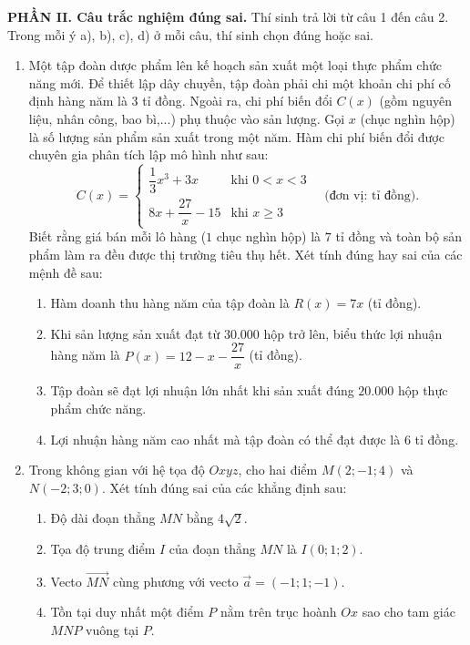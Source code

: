 \documentclass[12pt]{article}
\begin{document}
	\noindent\textbf{PHẦN II. Câu trắc nghiệm đúng sai.} Thí sinh trả lời từ câu 1 đến câu 2. Trong mỗi ý a), b), c), d) ở mỗi câu, thí sinh chọn đúng hoặc sai.
	\vspace{2mm}
	
	\begin{enumerate}[label=\textbf{Câu \arabic*.}, leftmargin=*]
		\item Một tập đoàn dược phẩm lên kế hoạch sản xuất một loại thực phẩm chức năng mới. Để thiết lập dây chuyền, tập đoàn phải chi một khoản chi phí cố định hàng năm là $3$ tỉ đồng. Ngoài ra, chi phí biến đổi $C(x)$ (gồm nguyên liệu, nhân công, bao bì,...) phụ thuộc vào sản lượng. Gọi $x$ (chục nghìn hộp) là số lượng sản phẩm sản xuất trong một năm. Hàm chi phí biến đổi được chuyên gia phân tích lập mô hình như sau:
		\[
		C(x) = \begin{cases} 
			\dfrac{1}{3}x^3 + 3x & \text{khi } 0 < x < 3 \\ 
			8x + \dfrac{27}{x} - 15 & \text{khi } x \ge 3 
		\end{cases} \quad \text{(đơn vị: tỉ đồng).}
		\]
		Biết rằng giá bán mỗi lô hàng ($1$ chục nghìn hộp) là $7$ tỉ đồng và toàn bộ sản phẩm làm ra đều được thị trường tiêu thụ hết. Xét tính đúng hay sai của các mệnh đề sau:
		
		\begin{enumerate}[label=\alph*)]
			\item Hàm doanh thu hàng năm của tập đoàn là $R(x) = 7x$ (tỉ đồng).
			\item Khi sản lượng sản xuất đạt từ $30.000$ hộp trở lên, biểu thức lợi nhuận hàng năm là $P(x) = 12 - x - \dfrac{27}{x}$ (tỉ đồng).
			\item Tập đoàn sẽ đạt lợi nhuận lớn nhất khi sản xuất đúng $20.000$ hộp thực phẩm chức năng.
			\item Lợi nhuận hàng năm cao nhất mà tập đoàn có thể đạt được là $6$ tỉ đồng.
		\end{enumerate}
		
		\vspace{4mm}
		\item Trong không gian với hệ tọa độ $Oxyz$, cho hai điểm $M(2; -1; 4)$ và $N(-2; 3; 0)$. Xét tính đúng sai của các khẳng định sau:
		\begin{enumerate}[label=\alph*)]
			\item Độ dài đoạn thẳng $MN$ bằng $4\sqrt{2}$.
			\item Tọa độ trung điểm $I$ của đoạn thẳng $MN$ là $I(0; 1; 2)$.
			\item Vecto $\overrightarrow{MN}$ cùng phương với vecto $\vec{a} = (-1; 1; -1)$.
			\item Tồn tại duy nhất một điểm $P$ nằm trên trục hoành $Ox$ sao cho tam giác $MNP$ vuông tại $P$.
		\end{enumerate}
	\end{enumerate}
	
\end{document}
